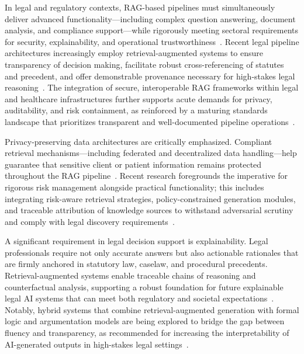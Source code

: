 \documentclass[sigconf]{acmart}
\begin{document}
In legal and regulatory contexts, RAG-based pipelines must simultaneously deliver advanced functionality---including complex question answering, document analysis, and compliance support---while rigorously meeting sectoral requirements for security, explainability, and operational trustworthiness~\cite{ref63, ref64}. Recent legal pipeline architectures increasingly employ retrieval-augmented systems to ensure transparency of decision making, facilitate robust cross-referencing of statutes and precedent, and offer demonstrable provenance necessary for high-stakes legal reasoning~\cite{ref63}. The integration of secure, interoperable RAG frameworks within legal and healthcare infrastructures further supports acute demands for privacy, auditability, and risk containment, as reinforced by a maturing standards landscape that prioritizes transparent and well-documented pipeline operations~\cite{ref63, ref64}.

Privacy-preserving data architectures are critically emphasized. Compliant retrieval mechanisms---including federated and decentralized data handling---help guarantee that sensitive client or patient information remains protected throughout the RAG pipeline~\cite{ref21, ref22, ref23, ref24, ref25, ref26, ref32, ref33, ref34, ref36, ref37, ref38, ref39, ref40, ref43, ref45, ref46, ref49, ref50, ref54, ref55, ref63}. Recent research foregrounds the imperative for rigorous risk management alongside practical functionality; this includes integrating risk-aware retrieval strategies, policy-constrained generation modules, and traceable attribution of knowledge sources to withstand adversarial scrutiny and comply with legal discovery requirements~\cite{ref2, ref3, ref5, ref8, ref10, ref13, ref14, ref15, ref16, ref17, ref18, ref19, ref20, ref21, ref22, ref23, ref24, ref25, ref26, ref29, ref30, ref32, ref33, ref34, ref36, ref37, ref38, ref39, ref40, ref43, ref45, ref46, ref49, ref50, ref54, ref55, ref63}.

A significant requirement in legal decision support is explainability. Legal professionals require not only accurate answers but also actionable rationales that are firmly anchored in statutory law, caselaw, and procedural precedents. Retrieval-augmented systems enable traceable chains of reasoning and counterfactual analysis, supporting a robust foundation for future explainable legal AI systems that can meet both regulatory and societal expectations~\cite{ref63}. Notably, hybrid systems that combine retrieval-augmented generation with formal logic and argumentation models are being explored to bridge the gap between fluency and transparency, as recommended for increasing the interpretability of AI-generated outputs in high-stakes legal settings~\cite{ref13}.
\end{document}
